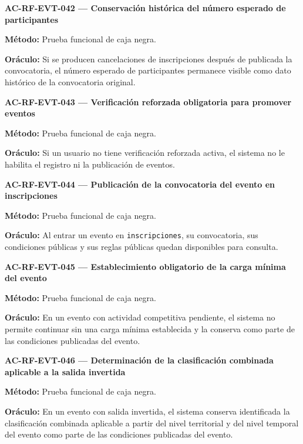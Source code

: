\documentclass[10pt,letterpaper]{article}
\begin{document}
\noindent\textbf{AC-RF-EVT-042 --- Conservación histórica del número esperado de participantes}\par
\textbf{Método:} Prueba funcional de caja negra.\par
\textbf{Oráculo:} Si se producen cancelaciones de inscripciones después de publicada la convocatoria, el número esperado de participantes permanece visible como dato histórico de la convocatoria original.\par\vspace{0.45em}
\noindent\textbf{AC-RF-EVT-043 --- Verificación reforzada obligatoria para promover eventos}\par
\textbf{Método:} Prueba funcional de caja negra.\par
\textbf{Oráculo:} Si un usuario no tiene verificación reforzada activa, el sistema no le habilita el registro ni la publicación de eventos.\par\vspace{0.45em}
\noindent\textbf{AC-RF-EVT-044 --- Publicación de la convocatoria del evento en inscripciones}\par
\textbf{Método:} Prueba funcional de caja negra.\par
\textbf{Oráculo:} Al entrar un evento en \texttt{inscripciones}, su convocatoria, sus condiciones públicas y sus reglas públicas quedan disponibles para consulta.\par\vspace{0.45em}
\noindent\textbf{AC-RF-EVT-045 --- Establecimiento obligatorio de la carga mínima del evento}\par
\textbf{Método:} Prueba funcional de caja negra.\par
\textbf{Oráculo:} En un evento con actividad competitiva pendiente, el sistema no permite continuar sin una carga mínima establecida y la conserva como parte de las condiciones publicadas del evento.\par\vspace{0.45em}
\noindent\textbf{AC-RF-EVT-046 --- Determinación de la clasificación combinada aplicable a la salida invertida}\par
\textbf{Método:} Prueba funcional de caja negra.\par
\textbf{Oráculo:} En un evento con salida invertida, el sistema conserva identificada la clasificación combinada aplicable a partir del nivel territorial y del nivel temporal del evento como parte de las condiciones publicadas del evento.\par\vspace{0.45em}
\end{document}
